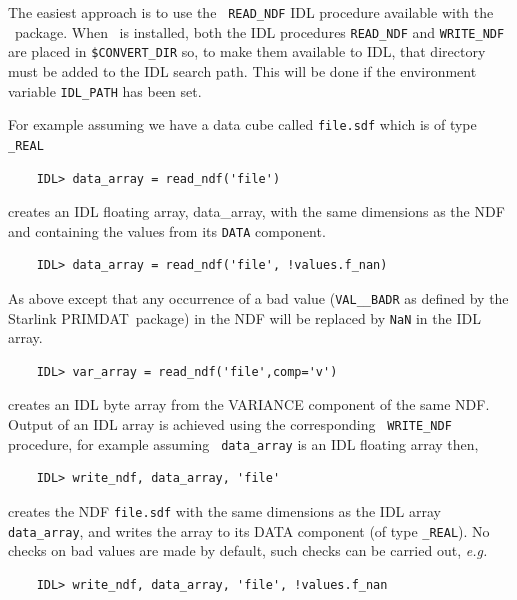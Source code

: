 \documentclass[twoside,11pt]{article}
\newcommand{\xref}[3]{#1}
\begin{document}
The easiest approach is to use the \xref{{\tt
READ\_NDF}}{sun55}{READ_NDF} IDL procedure available with the
\CONVERT\ package.  When \CONVERT\ is installed, both the
IDL procedures {\tt READ\_NDF} and {\tt WRITE\_NDF} are placed in
{\tt \$CONVERT\_DIR} so, to make them available to IDL, that directory
must be added to the IDL search path.  This will be done if the
environment variable {\tt IDL\_PATH} has been set.

For example assuming we have a data cube called {\tt file.sdf} which is
of type {\tt \_REAL}

\small\begin{verbatim}
    IDL> data_array = read_ndf('file') 
\end{verbatim}\normalsize

creates an IDL floating array, data\_array, with the same dimensions
as the NDF and containing the values from its {\tt DATA} component.

\small\begin{verbatim}
    IDL> data_array = read_ndf('file', !values.f_nan)
\end{verbatim}\normalsize

As above except that any occurrence of a bad value ({\tt VAL\_\_BADR}
as defined by the Starlink \xref{{\footnotesize
PRIMDAT}\normalsize}{sun39}{}\normalsize\ package) in the NDF will be replaced by
{\tt NaN} in the IDL array.

\small\begin{verbatim}
    IDL> var_array = read_ndf('file',comp='v')
\end{verbatim}\normalsize

creates an IDL byte array from the VARIANCE component of the same NDF.
Output of an IDL array is achieved using the corresponding \xref{{\tt
WRITE\_NDF}}{sun55}{WRITE_NDF} procedure, for example assuming {\tt
data\_array} is an IDL floating array then,

\small\begin{verbatim}
    IDL> write_ndf, data_array, 'file'
\end{verbatim}\normalsize

creates the NDF {\tt file.sdf} with the same dimensions as the IDL
array {\tt data\_array}, and writes the array to its DATA component
(of type {\tt \_REAL}).  No checks on bad values are made by default,
such checks can be carried out, \emph{e.g.}\

\small\begin{verbatim}
    IDL> write_ndf, data_array, 'file', !values.f_nan
\end{verbatim}\normalsize  
\end{document}
